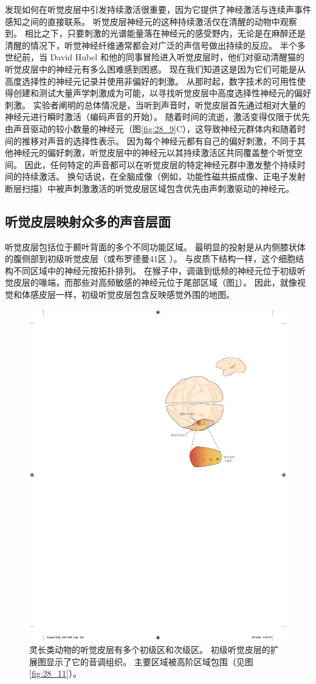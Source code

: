 发现如何在听觉皮层中引发持续激活很重要，因为它提供了神经激活与连续声事件感知之间的直接联系。 
听觉皮层神经元的这种持续激活仅在清醒的动物中观察到。 
相比之下，只要刺激的光谱能量落在神经元的感受野内，无论是在麻醉还是清醒的情况下，听觉神经纤维通常都会对广泛的声信号做出持续的反应。 
半个多世纪前，当 David Hubel 和他的同事冒险进入听觉皮层时，他们对驱动清醒猫的听觉皮层中的神经元有多么困难感到困惑。 
现在我们知道这是因为它们可能是从高度选择性的神经元记录并使用非偏好的刺激。 
从那时起，数字技术的可用性使得创建和测试大量声学刺激成为可能，以寻找听觉皮层中高度选择性神经元的偏好刺激。 
实验者阐明的总体情况是，当听到声音时，听觉皮层首先通过相对大量的神经元进行瞬时激活（编码声音的开始）。 
随着时间的流逝，激活变得仅限于优先由声音驱动的较小数量的神经元（图\ref{fig:28_9}C），这导致神经元群体内和随着时间的推移对声音的选择性表示。 
因为每个神经元都有自己的偏好刺激，不同于其他神经元的偏好刺激，听觉皮层中的神经元以其持续激活区共同覆盖整个听觉空间。 
因此，任何特定的声音都可以在听觉皮层的特定神经元群中激发整个持续时间的持续激活。 
换句话说，在全脑成像（例如，功能性磁共振成像、正电子发射断层扫描）中被声刺激激活的听觉皮层区域包含优先由声刺激驱动的神经元。



\subsection{听觉皮层映射众多的声音层面}

听觉皮层包括位于颞叶背面的多个不同功能区域。 
最明显的投射是从内侧膝状体的腹侧部到初级听觉皮层（或布罗德曼41区 ）。 
与皮质下结构一样，这个细胞结构不同区域中的神经元按拓扑排列。 
在猴子中，调谐到低频的神经元位于初级听觉皮层的喙端，而那些对高频敏感的神经元位于尾部区域（图\ref{fig:28_10}）。 
因此，就像视觉和体感皮层一样，初级听觉皮层包含反映感觉外围的地图。


\begin{figure}[htbp]
	\centering
	\includegraphics[width=0.5\linewidth]{chap28/fig_28_10}
	\caption{灵长类动物的听觉皮层有多个初级区和次级区。 
		初级听觉皮层的扩展图显示了它的音调组织。
		主要区域被高阶区域包围（见图 \ref{fig:28_11}）。}
	\label{fig:28_10}
\end{figure}


